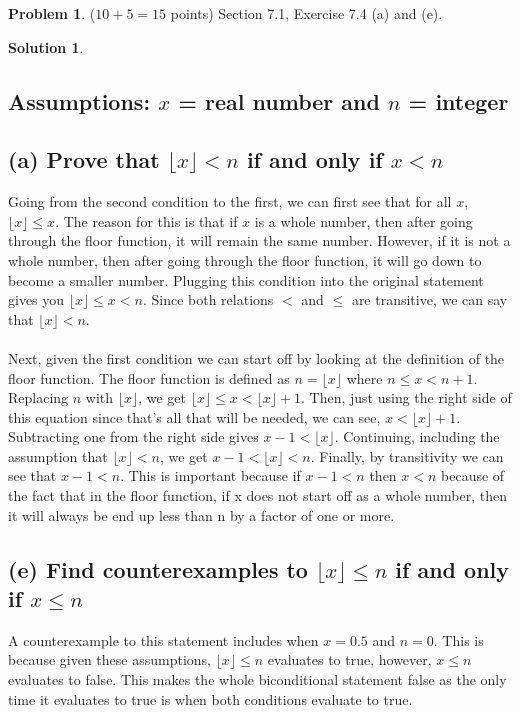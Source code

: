 \documentclass{article}
\theoremstyle{definition}
\newtheorem{problem}{Problem}
\newtheorem*{solution}{Solution}
\begin{document}
\newpage
\begin{problem} ($10+5=15$ points) Section 7.1, Exercise 7.4 (a) and (e).
\end{problem}
\begin{solution}
\hspace{1cm}
\subsection*{Assumptions: $x$ = real number and $n$ = integer}
\subsection*{(a) Prove that $\lfloor x \rfloor < n $ if and only if $x < n$}
Going from the second condition to the first, we can first see that for all $x$, $\lfloor x \rfloor \leqslant x$. The reason for this is that if $x$ is a whole number, then after going through the floor function, it will remain the same number. However, if it is not a whole number, then after going through the floor function, it will go down to become a smaller number. Plugging this condition into the original statement gives you $\lfloor x \rfloor \leqslant x < n$. Since both relations $<$ and $\leqslant$ are transitive, we can say that $\lfloor x \rfloor < n$.
\\\\Next, given the first condition we can start off by looking at the definition of the floor function. The floor function is defined as $n = \lfloor x \rfloor$ where $ n \leqslant x < n + 1$. Replacing $n$ with $\lfloor x \rfloor$, we get $\lfloor x \rfloor \leqslant x < \lfloor x \rfloor+1$. Then, just using the right side of this equation since that's all that will be needed, we can see, $x < \lfloor x \rfloor + 1$. Subtracting one from the right side gives $x-1 < \lfloor x \rfloor$. Continuing, including the assumption that $\lfloor x \rfloor < n$, we get $x - 1 < \lfloor x \rfloor < n$. Finally, by transitivity we can see that $x-1 < n$. This is important because if $x-1 < n$ then $x < n$ because of the fact that in the floor function, if x does not start off as a whole number, then it will always be end up less than n by a factor of one or more.
\subsection*{(e) Find counterexamples to $\lfloor x \rfloor \leqslant n$ if and only if $x \leqslant n$}
A counterexample to this statement includes when $x = 0.5$ and $n = 0$. This is because given these assumptions, $\lfloor x \rfloor \leqslant n$ evaluates to true, however, $x \leqslant n$ evaluates to false. This makes the whole biconditional statement false as the only time it evaluates to true is when both conditions evaluate to true.
\end{solution}
\end{document}
